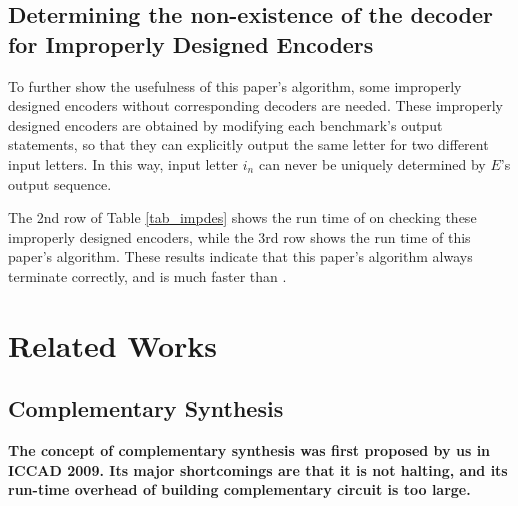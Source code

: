 \documentclass[journal]{IEEEtran}
\begin{document}
\subsection{Determining the non-existence of the decoder for Improperly Designed Encoders}\label{subsec_improp}
To further show the usefulness of this paper's algorithm,
some improperly designed encoders without corresponding decoders are needed.
These improperly designed encoders are obtained by modifying each benchmark's output statements,
so that they can explicitly output the same letter for two different input letters.
In this way,
input letter $i_n$ can never be uniquely determined by $E$'s output sequence.

The 2nd row of Table \ref{tab_impdes} shows the run time of \cite{ShengYuShen:fmcad10} on checking these improperly designed encoders,
while the 3rd row shows the run time of this paper's algorithm.
These results indicate that this paper's algorithm always terminate correctly,
and is much faster than \cite{ShengYuShen:fmcad10}.


\section{Related Works}\label{sec_relwork}
%
%

\subsection{Complementary Synthesis}\label{subsec_compsyn_relat}
\textbf{The concept of complementary synthesis was first proposed by us\cite{ShengYuShen:iccad09} in ICCAD 2009.
Its major shortcomings are that it is not halting,
and its run-time overhead of building complementary circuit is too large.}
\end{document}
